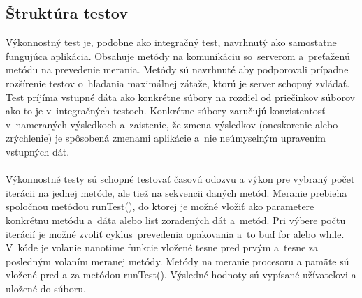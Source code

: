 \documentclass[
  digital, %
  table,   %
oneside,
  nolof,     %
  nolot,     %
]{fithesis3}
\begin{document}
\subsection{Štruktúra testov}
Výkonnostný test je, podobne ako integračný test, navrhnutý ako samostatne fungujúca aplikácia. Obsahuje metódy na komunikáciu so~serverom a~preťaženú metódu na prevedenie merania. Metódy sú navrhnuté aby podporovali prípadne rozšírenie testov o~hľadania maximálnej zátaže, ktorú je server schopný zvládať. Test príjíma vstupné dáta ako konkrétne súbory na rozdiel od priečinkov súborov ako to je v~integračných testoch. Konkrétne súbory zaručujú konzistentosť v~nameraných výsledkoch a~zaistenie, že zmena výsledkov (oneskorenie alebo zrýchlenie) je spôsobená zmenami aplikácie a~nie neúmyselným upravením vstupných dát. \paragraph{}

Výkonnostné testy sú schopné testovať časovú odozvu a výkon pre vybraný počet iterácii na jednej metóde, ale tiež na sekvencii daných metód. Meranie prebieha spoločnou metódou runTest(), do ktorej je možné vložiť ako parametere konkrétnu metódu a~dáta alebo list zoradených dát a~metód. Pri výbere počtu iterácií je možné zvoliť cyklus~prevedenia opakovania a~to buď for alebo while.
V~kóde je  volanie nanotime funkcie vložené tesne pred prvým a~tesne za posledným volaním meranej metódy. Metódy na meranie procesoru a pamäte sú vložené pred a za metódou runTest(). Výsledné hodnoty sú vypísané užívateľovi a uložené do súboru. 
\end{document}
